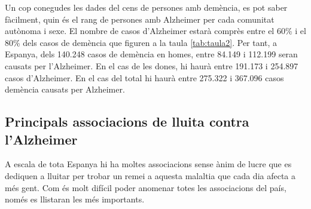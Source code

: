 \documentclass[a4paper,12pt]{article}
\begin{document}
\newpage
Un cop conegudes les dades del cens de persones amb demència, es pot saber fàcilment, quin és el rang de persones amb Alzheimer per cada comunitat autònoma i sexe. El nombre de casos d'Alzheimer estarà comprès entre el 60\% i el 80\% dels casos de demència que figuren a la taula \ref{tab:taula2}. Per tant, a Espanya, dels 140.248 casos de demència en homes, entre 84.149 i 112.199 seran causats per l'Alzheimer. En el cas de les dones, hi haurà entre  191.173 i 254.897 casos d'Alzheimer. En el cas del total hi haurà entre 275.322 i 367.096 casos demència causats per Alzheimer.
\subsection*{Principals associacions de lluita contra l'Alzheimer}
A escala de tota Espanya hi ha moltes associacions sense ànim de lucre que es dediquen a lluitar per trobar un remei a aquesta malaltia que cada dia afecta a més gent. Com és molt difícil poder anomenar totes les associacions del país, només es llistaran les més importants.
\end{document}
